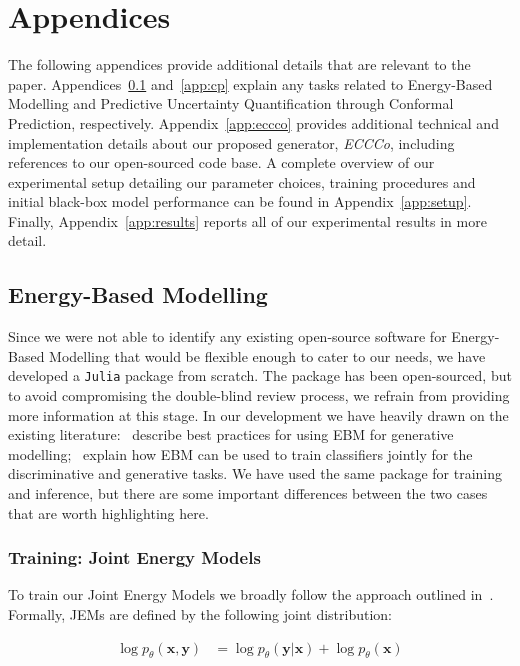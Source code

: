 \appendix
\section*{Appendices}
\renewcommand{\thesubsection}{\Alph{subsection}}

The following appendices provide additional details that are relevant to the paper. Appendices~\ref{app:jem} and~\ref{app:cp} explain any tasks related to Energy-Based Modelling and Predictive Uncertainty Quantification through Conformal Prediction, respectively. Appendix~\ref{app:eccco} provides additional technical and implementation details about our proposed generator, \textit{ECCCo}, including references to our open-sourced code base. A complete overview of our experimental setup detailing our parameter choices, training procedures and initial black-box model performance can be found in Appendix~\ref{app:setup}. Finally, Appendix~\ref{app:results} reports all of our experimental results in more detail.

\subsection{Energy-Based Modelling}\label{app:jem}

Since we were not able to identify any existing open-source software for Energy-Based Modelling that would be flexible enough to cater to our needs, we have developed a \texttt{Julia} package from scratch. The package has been open-sourced, but to avoid compromising the double-blind review process, we refrain from providing more information at this stage. In our development we have heavily drawn on the existing literature:~\citet{du2019implicit} describe best practices for using EBM for generative modelling;~\citet{grathwohl2020your} explain how EBM can be used to train classifiers jointly for the discriminative and generative tasks. We have used the same package for training and inference, but there are some important differences between the two cases that are worth highlighting here.

\subsubsection{Training: Joint Energy Models}

To train our Joint Energy Models we broadly follow the approach outlined in~\citet{grathwohl2020your}. Formally, JEMs are defined by the following joint distribution:

\begin{equation}
  \begin{aligned}
    \log p_{\theta}(\mathbf{x},\mathbf{y}) &= \log p_{\theta}(\mathbf{y}|\mathbf{x}) + \log p_{\theta}(\mathbf{x})
  \end{aligned}
\end{equation}

